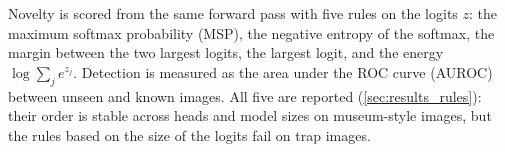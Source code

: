 Novelty is scored from the same forward pass with five rules on the logits $z$: the maximum softmax probability (MSP), the negative entropy of the softmax, the margin between the two largest logits, the largest logit, and the energy $\log \sum_j e^{z_j}$.
Detection is measured as the area under the ROC curve (AUROC) between unseen and known images.
All five are reported (\cref{sec:results_rules}): their order is stable across heads and model sizes on museum-style images, but the rules based on the size of the logits fail on trap images.
